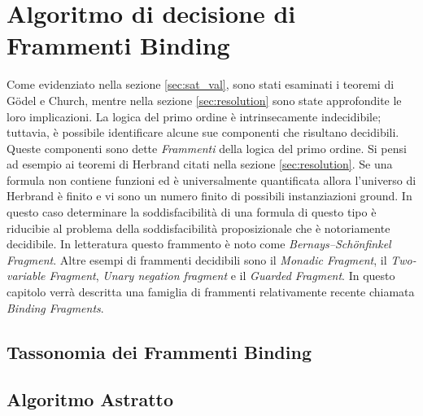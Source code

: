 \documentclass[./main.tex]{subfiles}
\begin{document}
\chapter{Algoritmo di decisione di Frammenti Binding}
Come evidenziato nella sezione \ref{sec:sat_val}, 
sono stati esaminati i teoremi di Gödel e Church, mentre nella sezione \ref{sec:resolution} sono state approfondite le loro implicazioni. 
La logica del primo ordine è intrinsecamente indecidibile; tuttavia, 
è possibile identificare alcune sue componenti che risultano decidibili.
Queste componenti sono dette \textit{Frammenti} della logica del primo ordine.
Si pensi ad esempio ai teoremi di Herbrand citati nella sezione \ref{sec:resolution}.
Se una formula non contiene funzioni ed è universalmente quantificata allora l'universo di Herbrand è finito e 
vi sono un numero finito di possibili instanziazioni ground. 
In questo caso determinare la soddisfacibilità di una formula di questo tipo
è riducibie al problema della soddisfacibilità proposizionale che è notoriamente decidibile.
In letteratura questo frammento è noto come \textit{Bernays–Schönfinkel Fragment}.
Altre esempi di frammenti decidibili sono il \textit{Monadic Fragment}, 
il \textit{Two-variable Fragment}, \textit{Unary negation fragment} e il \textit{Guarded Fragment}.
In questo capitolo verrà descritta una famiglia di frammenti relativamente recente chiamata \textit{Binding Fragments}.



\section{Tassonomia dei Frammenti Binding}
\section{Algoritmo Astratto}
\end{document}
